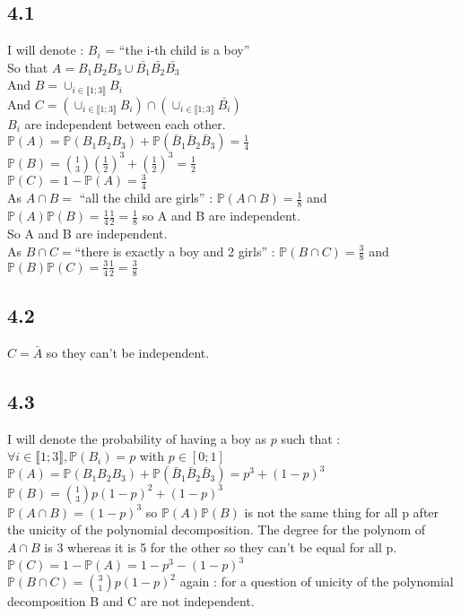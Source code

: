 \documentclass{article}
\begin{document}
    \subsection*{4.1}
    I will denote : $B_i$ = ``the i-th child is a boy''
    \\
    So that $A = B_1B_2B_3\cup\bar{B_1}\bar{B_2}\bar{B_3}$
    \\
    And $B =\cup_{i\in\llbracket1;3\rrbracket}B_i$ 
    \\
    And $C = (\cup_{i\in\llbracket1;3\rrbracket}B_i)\cap(\cup_{i\in\llbracket1;3\rrbracket}\bar{B_i}) $
    \\
    $B_i$ are independent between each other.
    \\
    $\mathbb{P}(A) = \mathbb{P}(B_1B_2B_3) + \mathbb{P}(\bar{B}_1\bar{B}_2\bar{B}_3) = \frac{1}{4}$
    \\
    $\mathbb{P}(B) = \binom{1}{3}(\frac{1}{2})^3+(\frac{1}{2})^3 = \frac{1}{2}$ 
    \\
    $\mathbb{P}(C) = 1 - \mathbb{P}(A) = \frac{3}{4}$
    \\
    As $A\cap B = $ ``all the child are girls'' : $\mathbb{P}(A\cap B) = \frac{1}{8}$
    and $\mathbb{P}(A)\mathbb{P}(B) = \frac{1}{4}\frac{1}{2} = \frac{1}{8}$ so A and B are independent.
    \\
    So A and B are independent.
    \\
    As $B\cap C = $``there is exactly a boy and 2 girls'' : $\mathbb{P}(B\cap C) = \frac{3}{8}$ and $\mathbb{P}(B)\mathbb{P}(C)= \frac{3}{4}\frac{1}{2}=\frac{3}{8}$
    \subsection*{4.2}
    $C =\bar{A}$ so they can't be independent.

    \subsection*{4.3}
    I will denote the probability of having a boy as $p$ such that : $\forall i\in \llbracket 1;3\rrbracket, \mathbb{P}(B_i)=p$ with $p\in [0;1]$
    \\
    $\mathbb{P}(A) = \mathbb{P}(B_1B_2B_3) + \mathbb{P}(\bar{B}_1\bar{B}_2\bar{B}_3) = p^3 + (1-p)^3$
    \\
    $\mathbb{P}(B) = \binom{1}{3}p(1-p)^2+(1-p)^3 $
    \\
    $\mathbb{P}(A\cap B) = (1-p)^3$ so $\mathbb{P}(A)\mathbb{P}(B)$ 
    is not the same thing for all p after the unicity of the polynomial decomposition.
    The degree for the polynom of $A\cap B$ is $3$ whereas it is 5 for the other so they can't be equal for all p.
    \\
    $\mathbb{P}(C) = 1 - \mathbb{P}(A) = 1 - p^3 -(1-p)^3$
    \\
    $\mathbb{P}(B\cap C) = \binom{3}{1}p(1-p)^2$ again : for a question of unicity of the polynomial decomposition B and C are not independent.
    
\end{document}
